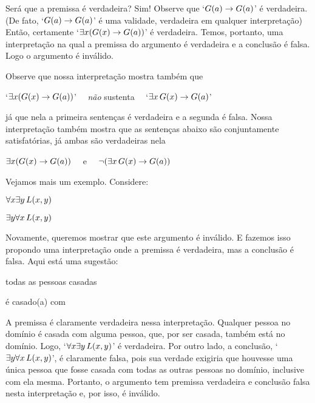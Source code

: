 Será que a premissa é verdadeira?
Sim!
Observe que `$\mathord{G}(a) \rightarrow \mathord{G}(a)$' é verdadeira. (De fato, `$\mathord{G}(a) \rightarrow \mathord{G}(a)$' é uma validade, verdadeira em qualquer interpretação)
Então, certamente `$\exists x (\mathord{G}(x) \rightarrow \mathord{G}(a))$' é verdadeira.
Temos, portanto, uma interpretação na qual a premissa do argumento é verdadeira e a conclusão é falsa.
Logo o argumento é inválido. 

Observe que nossa interpretação mostra também que
\begin{center}
	`$\exists x(\mathord{G}(x) \rightarrow \mathord{G}(a))$' \ \ \emph{não} sustenta \ \ `$\exists x\, \mathord{G}(x) \rightarrow \mathord{G}(a)$'
\end{center}
já que nela a primeira sentenças é verdadeira e a segunda é falsa.
Nossa interpretação também mostra que as sentenças abaixo são conjuntamente satisfatórias, já ambas são verdadeiras nela
\begin{center}
	$\exists x (\mathord{G}(x) \rightarrow \mathord{G}(a))$ \ \ e \ \ $\neg (\exists x\, \mathord{G}(x) \rightarrow \mathord{G}(a))$
\end{center}

Vejamos mais um exemplo.
Considere:
\begin{earg}
	\item[] $\forall x \exists y\, \mathord{L}(x,y)$
	\item[\therefore ] $\exists y \forall x\, \mathord{L}(x,y)$
\end{earg}

Novamente, queremos mostrar que este argumento é inválido.
E fazemos isso propondo uma interpretação onde a premissa é verdadeira, mas a conclusão é falsa.
Aqui está uma sugestão:
	\begin{center}
	\begin{ekey}
		\item[\text{domínio}] todas as pessoas casadas
		\item[\atom{L}{x,y}]  é casado(a) com 
	\end{ekey}
	\end{center}
A premissa é claramente verdadeira nessa interpretação. Qualquer pessoa no domínio é casada com alguma pessoa, que, por ser casada, também está no domínio.
Logo, `$\forall x \exists y\, \mathord{L}(x,y)$' é verdadeira.
Por outro lado, a conclusão, `$\exists y \forall x\, \mathord{L}(x,y)$',  é claramente falsa, pois sua verdade exigiria que houvesse uma única pessoa que fosse casada com todas as outras pessoas no domínio, inclusive com ela mesma.
Portanto, o argumento tem premissa verdadeira e conclusão falsa nesta interpretação e, por isso, é inválido.


